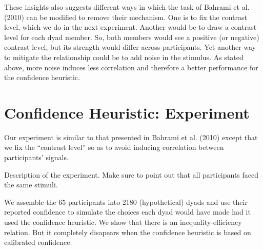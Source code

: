 \documentclass[12pt]{report}
\begin{document}
These insights also suggests different ways in which the task of Bahrami et al. (2010) can be modified to remove their mechanism. One is to fix the contrast level, which we do in the next experiment. Another would be to draw a contrast level for each dyad member. So, both members would see a positive (or negative) contrast level, but its strength would differ across participants. Yet another way to mitigate the relationship could be to add noise in the stimulus. As stated above, more noise induces less correlation and therefore a better performance for the confidence heuristic.

\chapter{Confidence Heuristic: Experiment} 
Our experiment is similar to that presented in Bahrami et al. (2010) except that we fix the ``contrast level'' so as to avoid inducing  correlation between participants' signals. 

Description of the experiment. Make sure to point out that all participants faced the same stimuli.

We assemble the 65 participants into 2180 (hypothetical) dyads and use their reported confidence to simulate the choices each dyad would have made had it used the confidence heuristic. We show that there is an inequality-efficiency relation. But it completely disapears when the confidence heuristic is based on calibrated confidence. 
\end{document}
